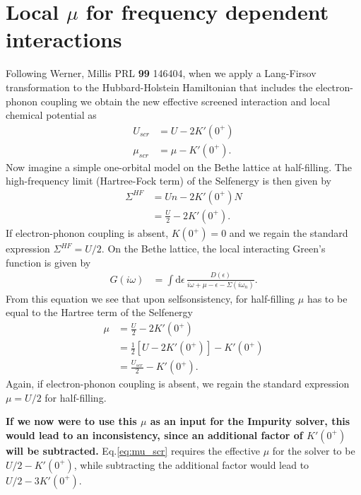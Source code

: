 \documentclass[12pt,a4paper]{scrartcl}
\numberwithin{equation}{section}
\begin{document}

\section{Local $\mu$ for frequency dependent interactions}
Following Werner, Millis PRL \textbf{99} 146404, when we apply a 
Lang-Firsov transformation to the Hubbard-Holstein Hamiltonian
that includes the electron-phonon coupling we obtain the new 
effective screened interaction and local chemical potential
as
\begin{align}
U_{scr}   &=   U - 2K'(0^+) \\
\mu_{scr} &= \mu - K'(0^+). \label{eq:mu_scr}
\end{align}
Now imagine a simple one-orbital model on the Bethe lattice at half-filling. The high-frequency
limit (Hartree-Fock term) of the Selfenergy is then given by
\begin{align}
\Sigma^{HF} &= Un - 2K'(0^+)N \nonumber \\
&= \frac{U}{2} - 2K'(0^+).
\end{align}
If electron-phonon coupling is absent, $K(0^+)=0$ and we regain
the standard expression $\Sigma^{HF} = U/2$.
On the Bethe lattice, the local interacting Green's function is given by
\begin{align}
G(i\omega)
&= \int\mathrm{d}\epsilon \, \frac{D(\epsilon)}{i\omega + \mu - \epsilon - \Sigma(i\omega_n)}.
\end{align}
From this equation we see that upon selfsonsistency, for half-filling $\mu$ has 
to be equal to the Hartree term of the Selfenergy
\begin{align}
\mu &= \frac{U}{2} - 2K'(0^+) \nonumber \\
&= \frac{1}{2} \left[ U - 2K'(0^+) \right] -K'(0^+) \nonumber \\
&= \frac{U_{scr}}{2} -K'(0^+) .
\end{align}
Again, if electron-phonon coupling is absent, we regain
the standard expression $\mu = U/2$ for half-filling. 

\textbf{If we now were to use this $\mu$ as an input for the Impurity solver, this would lead
to an inconsistency, since an additional factor of $K'(0^+)$ will be subtracted.}
Eq.\eqref{eq:mu_scr} requires the effective $\mu$ for the solver to be 
$U/2 - K'(0^+)$, while subtracting the additional factor would lead to 
$U/2 - 3K'(0^+)$.
\end{document}
